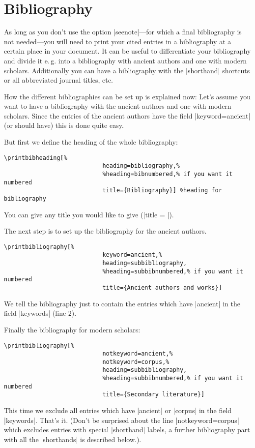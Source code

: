 \documentclass[a4paper,
10pt,
greek,
french,
spanish,
italian,
ngerman,
english
]{ltxdoc}
\begin{document}
	


\newpage
 \section{Bibliography}\label{bibliographie}
 \DescribeMacro{\printbibliography}
As long as you don’t use the option |seenote|---for 
which a final bibliography is not needed---you will need to print your cited entries in a bibliography 
at a certain place in your document.
It can be useful to differentiate your bibliography and divide it e.\,g. into a bibliography 
with ancient authors and one with modern scholars.
Additionally you can have a bibliography with the |shorthand| shortcuts or all abbreviated journal titles, etc.

How the different bibliographies can be set up is explained now:
Let’s assume you want to have a bibliography with the ancient authors and one with modern scholars.
Since the entries of the ancient authors have the field |keyword={ancient}| (or should have) this is done quite easy.

But first we define the heading of the whole  bibliography:
\begin{lstlisting}
\printbibheading[%
							heading=bibliography,%
							%heading=bibnumbered,% if you want it numbered
							title={Bibliography}] %heading for bibliography
\end{lstlisting}
You can give any title you would like to give (|title = |).

The next step is to set up the bibliography for the ancient authors.

\begin{lstlisting}
\printbibliography[%
							keyword=ancient,%
							heading=subbibliography,
							%heading=subbibnumbered,% if you want it numbered
							title={Ancient authors and works}]
\end{lstlisting}
We tell the bibliography just to contain the entries which have |ancient| in the field |keywords| (line 2).


Finally the bibliography for modern scholars:
\begin{lstlisting}
\printbibliography[%
							notkeyword=ancient,%
							notkeyword=corpus,%
							heading=subbibliography,
							%heading=subbibnumbered,% if you want it numbered
							title={Secondary literature}]
\end{lstlisting}
This time we exclude all entries which have |ancient| or |corpus| in the field |keywords|. 
That’s it.
(Don't be surprised about the line |notkeyword=corpus| which excludes entries with special |shorthand| labels, a further bibliography part with all the |shorthands| is described below.).
\end{document}
